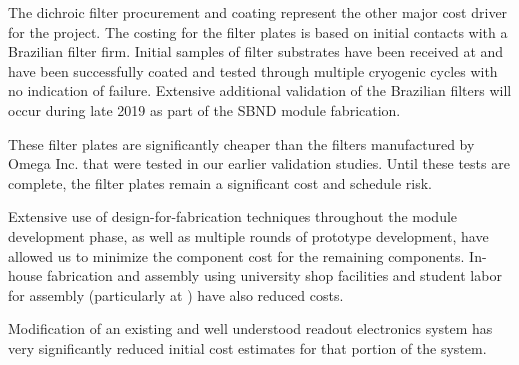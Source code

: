 The dichroic filter procurement and coating represent the other major cost driver for the project.  The costing for the filter plates is based on initial contacts with a Brazilian filter firm.  Initial samples of filter substrates have been received at  and have been successfully coated and tested through multiple cryogenic cycles with no indication of failure. Extensive additional validation of the Brazilian filters  will occur during late 2019 as part of the SBND module fabrication.

These filter plates are significantly cheaper than the filters manufactured by Omega Inc. that were tested in our earlier validation studies.  Until these tests are complete, the filter plates remain a significant cost and schedule risk.

Extensive use of design-for-fabrication techniques throughout the module development phase, as well as multiple rounds of prototype development, have allowed us to minimize the component cost for the remaining components.  In-house fabrication and assembly using university shop facilities and student labor for assembly (particularly at ) have also reduced costs.

Modification of an existing and well understood readout electronics system has very significantly reduced initial cost estimates for that portion of the system.

